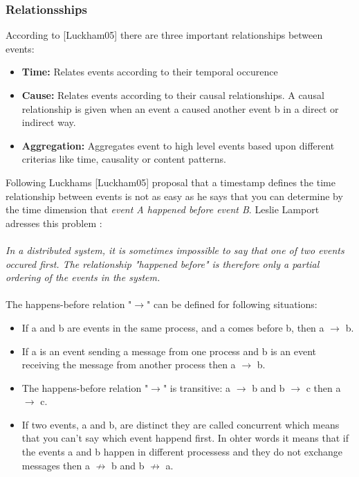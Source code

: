 \documentclass[a4paper,titlepage,11pt,DIV10,BCOR0.5cm,headinclude]{article}
\begin{document}
\subsubsection{Relationsships}
According to [Luckham05] there are three important relationships between events:
\begin{itemize}
	\item \textbf{Time:} Relates events according to their temporal occurence
	\item \textbf{Cause:} Relates events according to their causal relationships. A causal relationship is given when an event a caused another event b in a direct or indirect way.
	\item \textbf{Aggregation:} Aggregates event to high level events based upon different criterias like time, causality or content patterns.
\end{itemize}
Following Luckhams [Luckham05] proposal that a timestamp defines the time relationship between events is not as easy as he says that you can determine by the time dimension that \textit{event A happened before event B}. Leslie Lamport adresses this problem \cite{Lamport78}:
\\\\
\textit{In a distributed system, it is sometimes impossible to say that one of two events occured first. The relationship "happened before" is therefore only a partial ordering of the events in the system.} \cite{Lamport78}
\\\\
The happens-before relation "$\rightarrow$" can be defined for following situations:
\begin{itemize}
	\item If a and b are events in the same process, and a comes before b, then a $\rightarrow$ b.
	\item If a is an event sending a message from one process and b is an event receiving the message from another process then a $\rightarrow$ b.
	\item The happens-before relation "$\rightarrow$" is transitive: a $\rightarrow$ b and b $\rightarrow$ c then a $\rightarrow$ c. 
	\item If two events, a and b, are distinct they are called concurrent which means that you can't say which event happend first. In ohter words it means that if the events a and b happen in different processess and they do not exchange messages then a $\not\rightarrow$ b and b $\not\rightarrow$ a.
\end{itemize}
\end{document}
